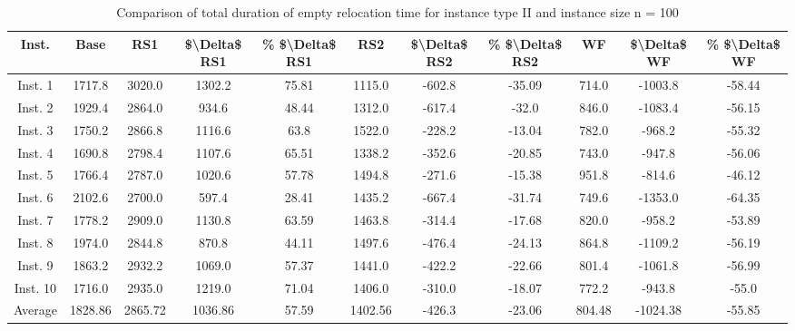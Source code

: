 \begin{table}[H]
\centering
\begin{tabular}{ccccccccccc}
  \hline
  \textbf{Inst.} & \textbf{Base} & \textbf{RS1} & \textbf{\$\textbackslash{}Delta\$  RS1} & \textbf{\% \$\textbackslash{}Delta\$  RS1} & \textbf{RS2} & \textbf{\$\textbackslash{}Delta\$  RS2} & \textbf{\% \$\textbackslash{}Delta\$  RS2} & \textbf{WF} & \textbf{\$\textbackslash{}Delta\$  WF} & \textbf{\% \$\textbackslash{}Delta\$  WF} \\\hline
  Inst. 1 & 1717.8 & 3020.0 & 1302.2 & 75.81 & 1115.0 & -602.8 & -35.09 & 714.0 & -1003.8 & -58.44 \\
  Inst. 2 & 1929.4 & 2864.0 & 934.6 & 48.44 & 1312.0 & -617.4 & -32.0 & 846.0 & -1083.4 & -56.15 \\
  Inst. 3 & 1750.2 & 2866.8 & 1116.6 & 63.8 & 1522.0 & -228.2 & -13.04 & 782.0 & -968.2 & -55.32 \\
  Inst. 4 & 1690.8 & 2798.4 & 1107.6 & 65.51 & 1338.2 & -352.6 & -20.85 & 743.0 & -947.8 & -56.06 \\
  Inst. 5 & 1766.4 & 2787.0 & 1020.6 & 57.78 & 1494.8 & -271.6 & -15.38 & 951.8 & -814.6 & -46.12 \\
  Inst. 6 & 2102.6 & 2700.0 & 597.4 & 28.41 & 1435.2 & -667.4 & -31.74 & 749.6 & -1353.0 & -64.35 \\
  Inst. 7 & 1778.2 & 2909.0 & 1130.8 & 63.59 & 1463.8 & -314.4 & -17.68 & 820.0 & -958.2 & -53.89 \\
  Inst. 8 & 1974.0 & 2844.8 & 870.8 & 44.11 & 1497.6 & -476.4 & -24.13 & 864.8 & -1109.2 & -56.19 \\
  Inst. 9 & 1863.2 & 2932.2 & 1069.0 & 57.37 & 1441.0 & -422.2 & -22.66 & 801.4 & -1061.8 & -56.99 \\
  Inst. 10 & 1716.0 & 2935.0 & 1219.0 & 71.04 & 1406.0 & -310.0 & -18.07 & 772.2 & -943.8 & -55.0 \\
  Average & 1828.86 & 2865.72 & 1036.86 & 57.59 & 1402.56 & -426.3 & -23.06 & 804.48 & -1024.38 & -55.85 \\\hline
\end{tabular}
\caption{Comparison of total duration of empty relocation time for instance type II and instance size n = 100}
\label{tab:wait:resrelocation-empty-relocation-comparison_II_100}
\end{table}
